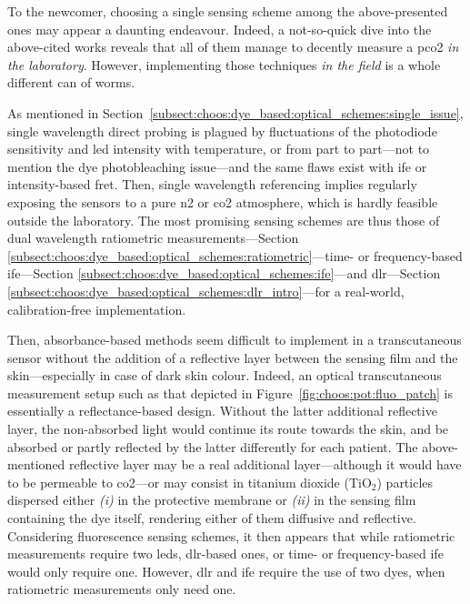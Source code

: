 To the newcomer, choosing a single sensing scheme among the above-presented ones may appear a daunting endeavour. Indeed, a not-so-quick dive into the above-cited works reveals that all of them manage to decently measure a \gls{pco2} \emph{in the laboratory}. However, implementing those techniques \emph{in the field} is a whole different can of worms.

As mentioned in Section~\ref{subsect:choos:dye_based:optical_schemes:single_issue}, single wavelength direct probing is plagued by fluctuations of the photodiode sensitivity and \gls{led} intensity with temperature, or from part to part---not to mention the dye photobleaching issue---and the same flaws exist with \gls{ife} or intensity-based \gls{fret}. Then, single wavelength referencing implies regularly exposing the sensors to a pure \gls{n2} or \gls{co2} atmosphere, which is hardly feasible outside the laboratory. The most promising sensing schemes are thus those of dual wavelength ratiometric measurements---Section \ref{subsect:choos:dye_based:optical_schemes:ratiometric}---time- or frequency-based \gls{ife}---Section \ref{subsect:choos:dye_based:optical_schemes:ife}---and \gls{dlr}---Section \ref{subsect:choos:dye_based:optical_schemes:dlr_intro}---for a real-world, calibration-free implementation.

Then, absorbance-based methods seem difficult to implement in a transcutaneous sensor without the addition of a reflective layer between the sensing film and the skin---especially in case of dark skin colour. Indeed, an optical transcutaneous measurement setup such as that depicted in Figure~\ref{fig:choos:pot:fluo_patch} is essentially a reflectance-based design. Without the latter additional reflective layer, the non-absorbed light would continue its route towards the skin, and be absorbed or partly reflected by the latter differently for each patient. The above-mentioned reflective layer may be a real additional layer---although it would have to be permeable to \gls{co2}---or may consist in titanium dioxide (TiO$_2$) particles dispersed either \textit{(i)} in the protective membrane or \textit{(ii)} in the sensing film containing the dye itself, rendering either of them diffusive and reflective\cite{borisov2007, dansby2010, pfeifer2020}. Considering fluorescence sensing schemes, it then appears that while ratiometric measurements require two \glspl{led}, \gls{dlr}-based ones, or time- or frequency-based \gls{ife} would only require one. However, \gls{dlr} and \gls{ife} require the use of two dyes, when ratiometric measurements only need one.

